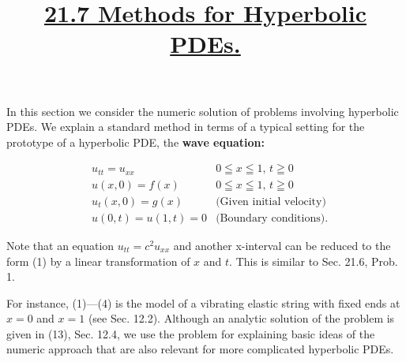 \newpage
\title{\underline{\LARGE{\textbf{21.7 Methods for Hyperbolic PDEs.}}} \\ {\Large\itshape }} %
\maketitle %
\vspace{5pt} 
\pagestyle{fancy}
\newline
In this section we consider the numeric solution of problems involving hyperbolic PDEs. We explain a standard method in terms of a typical setting for the prototype of a hyperbolic PDE, the \textbf{wave equation:} \\
\begin{graybox}
\begin{align}
& u_{tt} = u_{xx} & \text{$0\leqq x \leqq 1$, $t \geqq 0$} \tag{22.1} \\
& u(x,0) = f(x) & \text{$0\leqq x \leqq 1$, $t \geqq 0$} \tag{22.2} \\
& u_{t}(x,0) = g(x) & \text{(Given initial velocity)} \tag{22.3} \\
& u(0,t) = u(1,t)=0 & \text{(Boundary conditions).} \tag{22.4} 
\end{align}
\end{graybox}
Note that an equation $u_{tt}=c^2u_{xx}$ and another x-interval can be reduced to the form (1) by a linear transformation of $x$ and $t$. This is similar to Sec. 21.6, Prob. 1.

For instance, (1)---(4) is the model of a vibrating elastic string with fixed ends at $x=0$ and $x=1$ (see Sec. 12.2). Although an analytic solution of the problem is given in (13), Sec. 12.4, we use the problem for explaining basic ideas of the numeric approach that are also relevant for more complicated hyperbolic PDEs.

